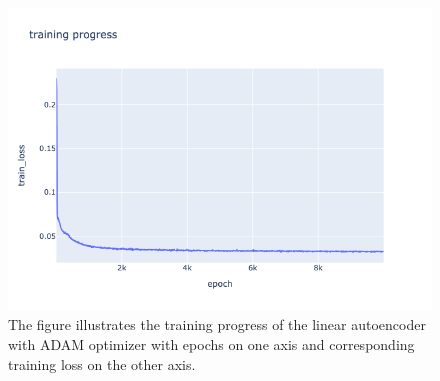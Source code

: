 \begin{figure}
\begin{center}
   \begin{minipage}[b]{0.9\linewidth}
      \includegraphics[width=\linewidth]{lin_AE_3d_adam_train}
      \caption{The figure illustrates the training progress of the linear autoencoder with ADAM optimizer with epochs on one axis and corresponding training loss on the other axis.}\label{fig:lin_AE_3d_adam_train}
	\end{minipage}
\end{center}
\end{figure}
